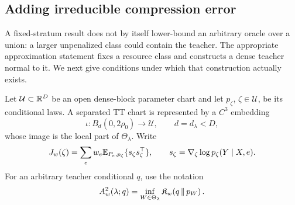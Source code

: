 \subsection{Adding irreducible compression error}

A fixed-stratum result does not by itself lower-bound an arbitrary oracle over
a union: a larger unpenalized class could contain the teacher.  The
appropriate approximation statement fixes a resource class and constructs a
dense teacher normal to it.  We next give conditions under which that
construction actually exists.

Let \(\mathcal U\subset\mathbb R^D\) be an open dense-block parameter chart and let
\(p_\zeta\), \(\zeta\in\mathcal U\), be its conditional laws.  A separated TT
chart is represented by a \(C^3\) embedding
\[
 \iota:B_d(0,2\rho_0)\longrightarrow\mathcal U,
 \qquad d=d_\lambda<D,
\]
whose image is the local part of \(\Theta_\lambda\).  Write
\[
 J_w(\zeta)=\sum_e w_e\mathbb E_{P_e,p_\zeta}
 \{s_\zeta s_\zeta^\top\},
 \qquad s_\zeta=\nabla_\zeta\log p_\zeta(Y\mid X,e).
\]
For an arbitrary teacher conditional \(q\), use the notation
\[
A_w^2(\lambda;q)=\inf_{W\in\Theta_\lambda}\mathfrak K_w\!\left(q\,\middle\|\,p_W\right).
\]

